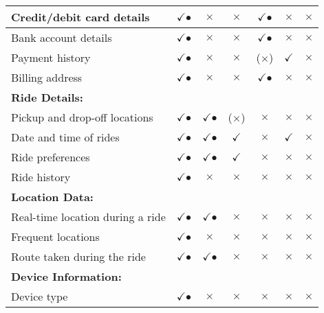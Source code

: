 \begin{table}[h]
\begin{tabular}{|l|c|c|c|c|c|c|}
\hline
Credit/debit card details & $\checkmark$$\bullet$ & $\times$ & $\times$ & $\checkmark$$\bullet$ & $\times$ & $\times$ \\
\hline
Bank account details & $\checkmark$$\bullet$ & $\times$ & $\times$ & $\checkmark$$\bullet$ & $\times$ & $\times$  \\
\hline
Payment history & $\checkmark$$\bullet$ & $\times$ & $\times$ & ($\times$) &$\checkmark$ & $\times$ \\
\hline
Billing address & $\checkmark$$\bullet$ & $\times$ & $\times$ & $\checkmark$$\bullet$ & $\times$ & $\times$ \\
\hline
\multicolumn{1}{|l|}{\textbf{Ride Details:}} & \multicolumn{1}{c}{} & \multicolumn{1}{c}{} & \multicolumn{1}{c}{} & \multicolumn{1}{c}{} & \multicolumn{1}{c}{} & \multicolumn{1}{c|}{} \\
\hline
Pickup and drop-off locations & $\checkmark$$\bullet$ & $\checkmark$$\bullet$ &  ($\times$) & $\times$ & $\times$ & $\times$ \\
\hline
Date and time of rides & $\checkmark$$\bullet$ & $\checkmark$$\bullet$ & $\checkmark$ & $\times$ & $\checkmark$ & $\times$ \\
\hline
Ride preferences & $\checkmark$$\bullet$ & $\checkmark$$\bullet$ & $\checkmark$ & $\times$ & $\times$ & $\times$ \\
\hline
Ride history & $\checkmark$$\bullet$ & $\times$ & $\times$ & $\times$ & $\times$ & $\times$ \\
\hline
\multicolumn{1}{|l|}{\textbf{Location Data: }} & \multicolumn{1}{c}{} & \multicolumn{1}{c}{} & \multicolumn{1}{c}{} & \multicolumn{1}{c}{} & \multicolumn{1}{c}{} & \multicolumn{1}{c|}{} \\
\hline
Real-time location during a ride & $\checkmark$$\bullet$ & $\checkmark$$\bullet$ & $\times$ & $\times$ & $\times$ & $\times$ \\
\hline
Frequent locations &$\checkmark$$\bullet$ & $\times$ & $\times$ & $\times$ & $\times$ & $\times$ \\
\hline
Route taken during the ride & $\checkmark$$\bullet$ & $\checkmark$$\bullet$ & $\times$ & $\times$ & $\times$ & $\times$ \\
\hline
\multicolumn{1}{|l|}{\textbf{Device Information: }} & \multicolumn{1}{c}{} & \multicolumn{1}{c}{} & \multicolumn{1}{c}{} & \multicolumn{1}{c}{} & \multicolumn{1}{c}{} & \multicolumn{1}{c|}{} \\
\hline
Device type & $\checkmark$$\bullet$ & $\times$ & $\times$ & $\times$ & $\times$ & $\times$ \\

\end{tabular}
\end{table}
